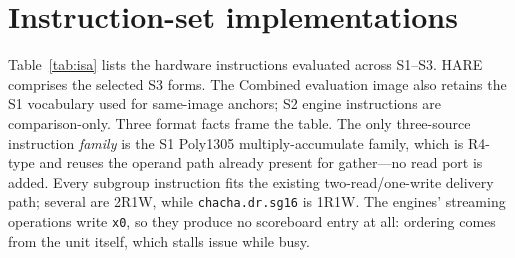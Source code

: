 \documentclass[conference]{IEEEtran}
\begin{document}
\section{Instruction-set implementations}\label{sec:ise}

Table~\ref{tab:isa} lists the hardware instructions evaluated across S1--S3.
HARE comprises the selected S3 forms. The Combined evaluation image also
retains the S1 vocabulary used for same-image anchors; S2 engine instructions
are comparison-only. Three format facts frame the table. The
only three-source instruction \emph{family} is the S1
Poly1305 multiply-accumulate family, which is R4-type and reuses the operand
path already present for gather---no read port is added. Every subgroup
instruction fits the existing two-read/one-write delivery path; several are
2R1W, while \texttt{chacha.dr.sg16} is 1R1W. The engines' streaming
operations write \texttt{x0}, so they produce no
scoreboard entry at all: ordering comes from the unit itself, which stalls
issue while busy.
\end{document}
